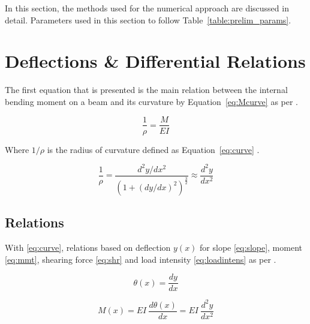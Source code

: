 \label{chapt:prelim}

In this section, the methods used for the numerical approach are discussed in detail. Parameters used in this section to follow Table~\ref{table:prelim_params}.\\


\section{Deflections \& Differential Relations}

The first equation that is presented is the main relation between the internal bending moment on a beam and its curvature by Equation~\ref{eq:Mcurve} as per \cite{nisbett2014shigley}. 

\begin{equation}
	\label{eq:Mcurve}
	\frac{1}{\rho}=\frac{M}{EI}
\end{equation}

Where $1/\rho$ is the radius of curvature defined as Equation~\ref{eq:curve} \cite{nisbett2014shigley}.

\begin{equation}
	\label{eq:curve}
	\frac{1}{\rho}=\frac{d^2y/dx^2}{\left( 1 +(dy/dx)^2 \right)^\frac{3}{2}} \approx \frac{d^2y}{dx^2}
\end{equation}

\subsection{Relations}

With \ref{eq:curve}, relations based on deflection $y(x)$ for slope \ref{eq:slope}, moment \ref{eq:mmt}, shearing force \ref{eq:shr} and load intensity \ref{eq:loadintens} as per \cite{nisbett2014shigley}.

\begin{equation}
	\label{eq:slope}
	\theta(x) = \frac{dy}{dx}
\end{equation}

\begin{equation}
	\label{eq:mmt}
	M(x) = EI\ \frac{d\theta(x)}{dx} = EI\ \frac{d^2y}{dx^2}
\end{equation}

